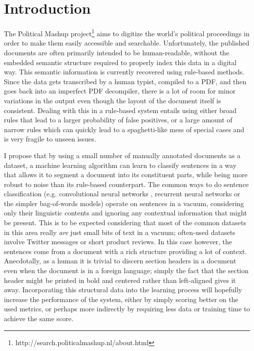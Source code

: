 \chapter{Introduction}
The Political Mashup
project\footnote{http://search.politicalmashup.nl/about.html} aims to digitize
the world's political proceedings in order to make them easily accessible and
searchable. Unfortunately, the published documents are often primarily intended
to be human-readable, without the embedded semantic structure required to
properly index this data in a digital way. This semantic information is
currently recovered using rule-based methods. Since the data gets transcribed by
a human typist, compiled to a PDF, and then goes back into an imperfect PDF
decompiler, there is a lot of room for minor variations in the output even
though the layout of the document itself is consistent. Dealing with this in a
rule-based system entails using either broad rules that lead to a larger
probability of false positives, or a large amount of narrow rules which can
quickly lead to a spaghetti-like mess of special cases and is very fragile to
unseen issues.

I propose that by using a small number of manually annotated documents as a
dataset, a machine learning algorithm can learn to classify sentences in a way
that allows it to segment a document into its constituent parts, while being
more robust to noise than its rule-based counterpart. The common ways to do
sentence classification (e.g. convolutional neural networks \citep{kim2014conv}
, recurrent neural networks or the simpler bag-of-words models) operate on
sentences in a vacuum, considering only their linguistic contents and ignoring
any contextual information that might be present. This is to be expected
considering that most of the common datasets in this area really \emph{are} just
small bits of text in a vacuum; often-used datasets involve Twitter messages
or short product reviews. In this case however, the sentences come from a
document with a rich structure providing a lot of context. Anecdotally, as a
human it is trivial to discern section headers in a document even when the
document is in a foreign language; simply the fact that the section header might
be printed in bold and centered rather than left-aligned gives it away.
Incorporating this structural data into the learning process will hopefully
increase the performance of the system, either by simply scoring better on the
used metrics, or perhaps more indirectly by requiring less data or training time
to achieve the same score.

